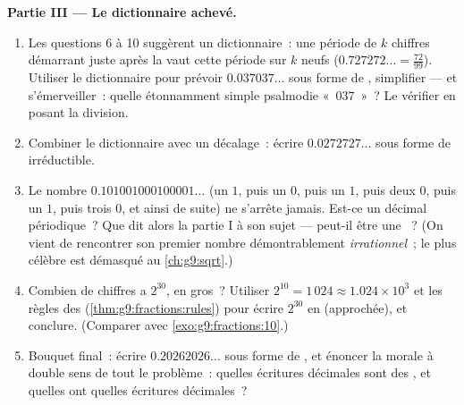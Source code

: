 \begin{problem}
\medskip
\noindent\textbf{Partie III --- Le dictionnaire achevé.}
\begin{enumerate}[resume]
  \item Les questions 6 à 10 suggèrent un dictionnaire~: une
        période de $k$ chiffres démarrant juste après la 
        vaut cette période sur $k$ neufs
        ($0.727272\ldots = \frac{72}{99}$). Utiliser le
        dictionnaire pour prévoir $0.037037\ldots$ sous forme de
        , simplifier --- et s'émerveiller~: quelle 
        étonnamment simple psalmodie «~$037$~»~? Le vérifier en
        posant la division.
  \item Combiner le dictionnaire avec un décalage~: écrire
        $0.0272727\ldots$ sous forme de  irréductible.
  \item Le nombre $0.101001000100001\ldots$ (un $1$, puis un $0$,
        puis un $1$, puis deux $0$, puis un $1$, puis trois $0$, et
        ainsi de suite) ne s'arrête jamais. Est-ce un décimal
        périodique~? Que dit alors la partie I à son sujet ---
        peut-il être une ~? (On vient de rencontrer son
        premier nombre démontrablement \emph{irrationnel}~; le plus
        célèbre est démasqué au \cref{ch:g9:sqrt}.)
  \item Combien de chiffres a $2^{30}$, en gros~? Utiliser
        $2^{10} = 1\,024 \approx 1.024 \times 10^3$ et les règles
        des  (\cref{thm:g9:fractions:rules}) pour écrire
        $2^{30}$ en  (approchée), et conclure.
        (Comparer avec \cref{exo:g9:fractions:10}.)
  \item Bouquet final~: écrire $0.20262026\ldots$ sous forme de
        , et énoncer la morale à double sens de tout le
        problème~: quelles écritures décimales sont des ,
        et quelles  ont quelles écritures décimales~?
\end{enumerate}
\end{problem}
